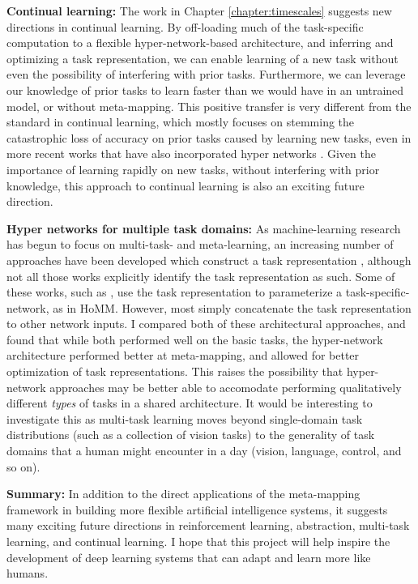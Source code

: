 \textbf{Continual learning:} The work in Chapter \ref{chapter:timescales} suggests new directions in continual learning. By off-loading much of the task-specific computation to a flexible hyper-network-based architecture, and inferring and optimizing a task representation, we can enable learning of a new task without even the possibility of interfering with prior tasks. Furthermore, we can leverage our knowledge of prior tasks to learn faster than we would have in an untrained model, or without meta-mapping. This positive transfer is very different from the standard in continual learning, which mostly focuses on stemming the catastrophic loss of accuracy on prior tasks caused by learning new tasks, even in more recent works that have also incorporated hyper networks \citep{Oswald2020}. Given the importance of learning rapidly on new tasks, without interfering with prior knowledge, this approach to continual learning is also an exciting future direction. \par 

\textbf{Hyper networks for multiple task domains:} As machine-learning research has begun to focus on multi-task- and meta-learning, an increasing number of approaches have been developed which construct a task representation \citep{Hermann2017, Zintgraf2018, Rusu2019}, although not all those works explicitly identify the task representation as such. Some of these works, such as  \citet{Rusu2019}, use the task representation to parameterize a task-specific-network, as in HoMM. However, most simply concatenate the task representation to other network inputs. I compared both of these architectural approaches, and found that while both performed well on the basic tasks, the hyper-network architecture performed better at meta-mapping, and allowed for better optimization of task representations. This raises the possibility that hyper-network approaches may be better able to accomodate performing qualitatively different \emph{types} of tasks in a shared architecture. It would be interesting to investigate this as multi-task learning moves beyond single-domain task distributions (such as a collection of vision tasks) to the generality of task domains that a human might encounter in a day (vision, language, control, and so on). 

\textbf{Summary:} In addition to the direct applications of the meta-mapping framework in building more flexible artificial intelligence systems, it suggests many exciting future directions in reinforcement learning, abstraction, multi-task learning, and continual learning. I hope that this project will help inspire the development of deep learning systems that can adapt and learn more like humans. \par 

